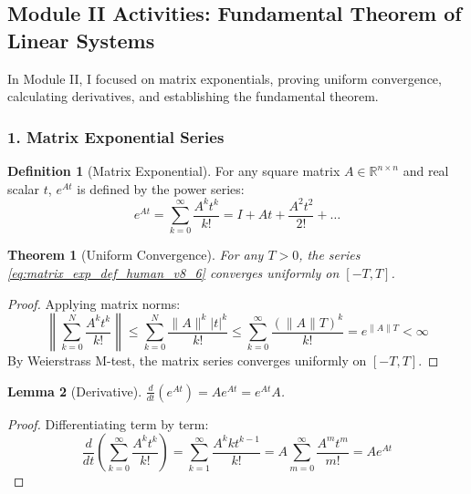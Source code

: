 \documentclass[12pt,a4paper,oneside]{article}
\theoremstyle{definition}
\newtheorem{definition}{Definition}[section]
\theoremstyle{plain}
\newtheorem{theorem}{Theorem}[section]
\newtheorem{lemma}[theorem]{Lemma}
\begin{document}
\subsection{Module II Activities: Fundamental Theorem of Linear Systems}

In Module II, I focused on matrix exponentials, proving uniform convergence, calculating derivatives, and establishing the fundamental theorem.

\subsubsection{1. Matrix Exponential Series}

\begin{definition}[Matrix Exponential]
For any square matrix $A \in \mathbb{R}^{n \times n}$ and real scalar $t$, $e^{At}$ is defined by the power series:
\begin{equation}
    e^{At} = \sum_{k=0}^{\infty} \frac{A^k t^k}{k!} = I + A t + \frac{A^2 t^2}{2!} + \dots
    \label{eq:matrix_exp_def_human_v8_6}
\end{equation}
\end{definition}

\begin{theorem}[Uniform Convergence]
For any $T > 0$, the series \eqref{eq:matrix_exp_def_human_v8_6} converges uniformly on $[-T, T]$.
\end{theorem}

\begin{proof}
Applying matrix norms:
\begin{equation}
    \left\| \sum_{k=0}^N \frac{A^k t^k}{k!} \right\| \le \sum_{k=0}^N \frac{\|A\|^k |t|^k}{k!} \le \sum_{k=0}^{\infty} \frac{(\|A\| T)^k}{k!} = e^{\|A\| T} < \infty
\end{equation}
By Weierstrass M-test, the matrix series converges uniformly on $[-T, T]$.
\end{proof}

\begin{lemma}[Derivative]
$\frac{d}{dt}(e^{At}) = A e^{At} = e^{At} A$.
\end{lemma}

\begin{proof}
Differentiating term by term:
\begin{equation}
    \frac{d}{dt}\left( \sum_{k=0}^{\infty} \frac{A^k t^k}{k!} \right) = \sum_{k=1}^{\infty} \frac{A^k k t^{k-1}}{k!} = A \sum_{m=0}^{\infty} \frac{A^m t^m}{m!} = A e^{At}
\end{equation}
\end{proof}
\end{document}
